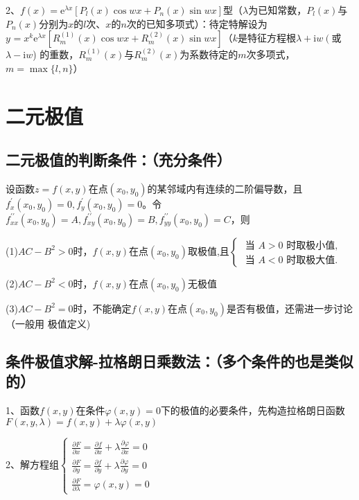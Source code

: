 2、$f(x)=\mathrm{e}^{\lambda x}\left[P_{l}(x) \cos w x+P_{n}(x) \sin w x\right]$型（$\lambda$为已知常数，$P_{l}(x)$与$P_{n}(x)$分别为$x$的$l$次、$x$的$n$次的已知多项式）：待定特解设为$y^{}=x^{k} \mathrm{e}^{\lambda x}\left[R_{m}^{(1)}(x) \cos w x+R_{m}^{(2)}(x) \sin w x\right]$（$k$是特征方程根$\lambda+\mathrm{i} w\left(\right.$或$\lambda-\mathrm{i} w$) 的重数，$R_{m}^{(1)}(x)$与$R_{m}^{(2)}(x)$为系数待定的$m$次多项式，$m=\max \{l, n\}$）

\section{二元极值}



\subsection{二元极值的判断条件：（充分条件）}

设函数$z=f(x, y)$在点$\left(x_{0}, y_{0}\right)$的某邻域内有连续的二阶偏导数，且$f_{x}^{\prime}\left(x_{0}, y_{0}\right)=0, f_{y}^{\prime}\left(x_{0}, y_{0}\right)=0$。令$f_{x x}^{\prime \prime}\left(x_{0}, y_{0}\right)=A, f_{x y}^{\prime \prime}\left(x_{0}, y_{0}\right)=B, f_{y y}^{\prime \prime}\left(x_{0}, y_{0}\right)=C$，则

(1)$A C-B^{2}>0$时，$f(x, y)$在点$\left(x_{0}, y_{0}\right)$取极值,且$\left\{\begin{array}{l}\text { 当 } A>0 \text { 时取极小值, } \\ \text { 当 } A<0 \text { 时取极大值. }\end{array}\right.$

(2)$A C-B^{2}<0$时，$f(x, y)$在点$\left(x_{0}, y_{0}\right)$无极值

(3)$A C-B^{2}=0$时，不能确定$f(x, y)$在点$\left(x_{0}, y_{0}\right)$是否有极值，还需进一步讨论（一般用 极值定义)



\subsection{条件极值求解-拉格朗日乘数法：（多个条件的也是类似的）}

1、函数$f(x, y)$在条件$\varphi(x, y)=0$下的极值的必要条件，先构造拉格朗日函数$F(x, y, \lambda)=f(x, y)+\lambda \varphi(x, y)$

2、解方程组$\left\{\begin{array}{l} \frac{\partial F}{\partial x}=\frac{\partial f}{\partial x}+\lambda \frac{\partial \varphi}{\partial x}=0 \\ \frac{\partial F}{\partial y}=\frac{\partial f}{\partial y}+\lambda \frac{\partial \varphi}{\partial y}=0 \\ \frac{\partial F}{\partial \lambda}=\varphi(x, y)=0 \end{array}\right.$

